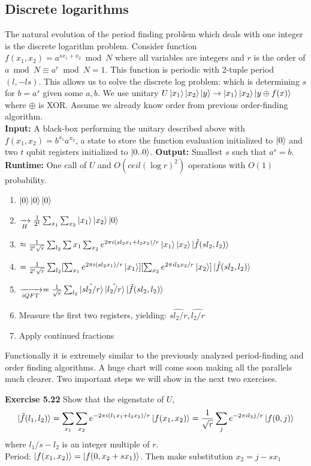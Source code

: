\documentclass{article}
\begin{document}
\subsection{Discrete logarithms}
The natural evolution of the period finding problem which deals with one integer is the discrete logarithm problem. Consider function $f(x_1,x_2) = a^{sx_1 + x_2} \bmod N$ where all variables are integers and $r$ is the order of $a \bmod N  \equiv a^r \bmod N = 1$. This function is periodic with 2-tuple period $(l, -ls)$. This allows us to solve the discrete log problem: which is determining $s$ for $b=a^s$ given some $a,b$. We use unitary $U \ket{x_1}\ket{x_2} \ket{y} \to \ket{x_1} \ket{x_2} \ket{y \oplus f(x)}$ where $\oplus$ is XOR. Assume we already know order from previous order-finding algorithm.\\
\textbf{Input:} A black-box performing the unitary described above with $f(x_1,x_2) = b^{x_1} a^{x_2}$, a state to store the function evaluation initialized to $\ket{0}$ and two $t$ qubit registers initialized to $\ket{0..0}$.
\textbf{Output:} Smallest $s$ such that $a^s = b$. \\
\textbf{Runtime:} One call of $U$ and $O(ceil(\log r)^2)$ operations with $O(1)$ probability.
\begin{enumerate}
	\item $\ket{0}\ket{0}\ket{0}$
	\item $\xrightarrow[H]{} \frac{1}{2^t} \sum_{x_1} \sum_{x_2} \ket{x_1} \ket{x_2} \ket0 $
	\item $\approx \frac{1}{2^t \sqrt{r}} \sum_{l_2} \sum{x_1}\sum_{x_2} e^{2\pi i (s l_2 x_1 + l_2 x_2)/r} \ket{x_1} \ket{x_2} \ket{\hat{f}(s l_2, l_2)}$
	\item $= \frac{1}{2^t \sqrt{r}} \sum_{l_2} [\sum_{x_1} e^{2\pi i (s l_2 x_1)/r} \ket{x_1}] [\sum_{x_2} e^{2\pi i l_2 x_2/r} \ket{x_2}] \ket{\hat{f}(sl_2, l_2)}$
	\item $\xrightarrow[iQFT]{} = \frac{1}{\sqrt{r}} \sum_{l_2} \ket{\hat{sl_2/r}} \ket{\hat{l_2/r}} \ket{\hat{f}(sl_2, l_2)}$
	\item Measure the first two registers, yielding: $\hat{s l_2/r}, \hat{l_2/r}$
	\item Apply continued fractions
\end{enumerate}
Functionally it is extremely similar to the previously analyzed period-finding and order finding algorithms. A huge chart will come soon making all the parallels much clearer. Two important steps we will show in the next two exercises.
\begin{tcolorbox}\textbf{Exercise 5.22} Show that the eigenstate of $U$,
	$$\ket{\hat{f}(l_1, l_2)} = \sum_{x_1} \sum_{x_2} e^{-2\pi i (l_1 x_1 + l_2 x_2)/r} \ket{f(x_1,x_2)} = \frac{1}{\sqrt{r}} \sum_{j} e^{-2 \pi i l_2 j/r} \ket{f(0,j)}$$ where $l_1/s - l_2$ is an integer multiple of $r$. 
	\\ 
	Period: $\ket{f(x_1,x_2)} = \ket{f(0, x_2 + sx_1)}$. Then make substitution $x_2 = j - sx_1$
\end{tcolorbox}
\end{document}

